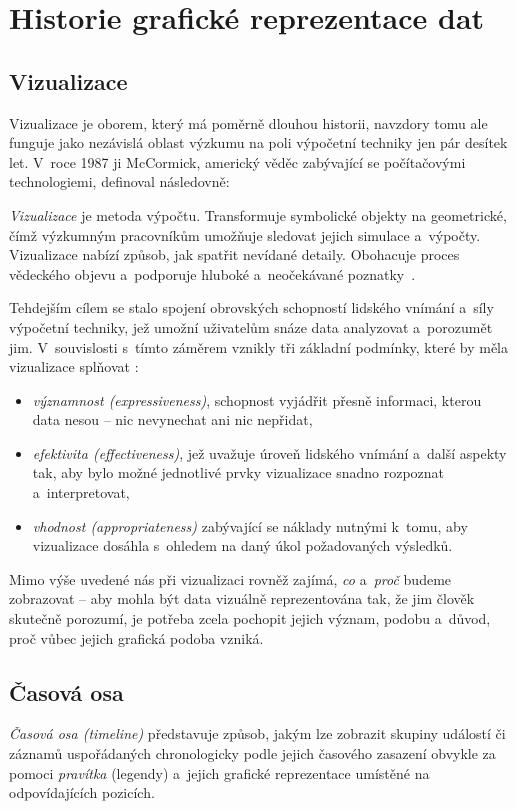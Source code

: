 \graphicspath{{text/teoreticky-uvod/img/}}

\chapter{Historie grafické reprezentace dat}
\label{historie}	
	\section{Vizualizace}
	\label{teorie-vizualizace}
		Vizualizace je oborem, který má poměrně dlouhou historii, navzdory tomu ale funguje jako nezávislá oblast výzkumu na poli výpočetní techniky jen pár desítek let. V~roce 1987 ji McCormick, americký věděc zabývající se počítačovými technologiemi, definoval následovně:
		\begin{mydef}
		\label{def:vizualizace}
		\emph{Vizualizace} je metoda výpočtu. Transformuje symbolické objekty na geometrické, čímž výzkumným pracovníkům umožňuje sledovat jejich simulace a~výpočty. Vizualizace nabízí způsob, jak spatřit nevídané detaily. Obohacuje proces vědeckého objevu a~podporuje hluboké a~neočekávané poznatky~\cite{cormick-1987}.
		\end{mydef}
		Tehdejším cílem se stalo spojení obrovských schopností lidského vnímání a~síly výpočetní techniky, jež umožní uživatelům snáze data analyzovat a~porozumět jim. V~souvislosti s~tímto záměrem vznikly tři základní podmínky, které by měla vizualizace splňovat \cite{aigner-2011}:
		\begin{itemize}
			\item \emph{významnost (expressiveness)}, schopnost vyjádřit přesně informaci, kterou data nesou -- nic nevynechat ani nic nepřidat,
			\item \emph{efektivita (effectiveness)}, jež uvažuje úroveň lidského vnímání a~další as\-pekty tak, aby bylo možné jednotlivé prvky vizualizace snadno rozpoznat a~interpretovat,
			\item \emph{vhodnost (appropriateness)} zabývající se náklady nutnými k~tomu, aby vizualizace dosáhla s~ohledem na daný úkol požadovaných výsledků.
		\end{itemize}
		Mimo výše uvedené nás při vizualizaci rovněž zajímá, \emph{co} a~\emph{proč} budeme zobrazovat -- aby mohla být data vizuálně reprezentována tak, že jim člověk skutečně porozumí, je potřeba zcela pochopit jejich význam, podobu a~důvod, proč vůbec jejich grafická podoba vzniká.

	\section{Časová osa}
	\label{casova-osa}
		\begin{mydef}
			\label{def:casova-osa}
			\emph{Časová osa (timeline)} představuje způsob, jakým lze zobrazit skupiny událostí či záznamů uspořádaných chronologicky podle jejich časového zasazení \cite{grafton-2013} obvykle za pomoci \emph{pravítka} (legendy) a~jejich grafické reprezentace umístěné na odpovídajících pozicích.
		\end{mydef}
					
